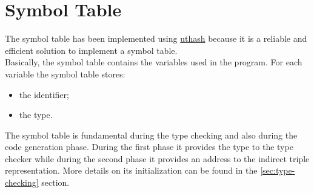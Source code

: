 \section{Symbol Table}
The symbol table has been implemented using
\href{https://troydhanson.github.io/uthash/}{uthash} because it is a reliable
and efficient solution to implement a symbol table.
\\
Basically, the symbol table contains the variables used in the program.
For each variable the symbol table stores:
\begin{itemize}
	\item the identifier;
	\item the type.
\end{itemize}

The symbol table is fundamental during the type checking and also during the
code generation phase. During the first phase it provides the type to the
type checker while during the second phase it provides an address to the 
indirect triple representation.
More details on its initialization can be found in the \ref{sec:type-checking}
section.
